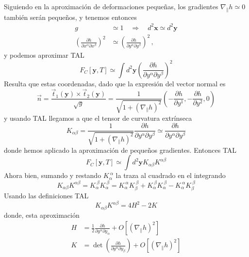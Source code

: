 Siguiendo en la aproximación de deformaciones pequeñas, los gradientes
$\nabla_{\|} h\simeq 0$ también serán pequeños, y tenemos entonces
\begin{align}
g&\simeq 1\quad\Rightarrow\quad d^2\mathbf{x}\simeq d^2\mathbf{y}\\
\left(\frac{\partial h}{\partial
  x^{\alpha} \partial x^{\beta}}\right)^2&\simeq \left(\frac{\partial h}{\partial
  y^{\alpha} \partial y^{\beta}}\right)^2\, ,
\end{align}
y podemos aproximar TAL
\begin{equation}
F_C[\mathbf{y},T]\simeq\int d^2\mathbf{y} \left(\frac{\partial h}{\partial
  y^{\alpha} \partial y^{\beta}}\right)^2
\end{equation}
Resulta que estas coordenadas, dado que la expresión del vector normal es
\begin{equation}
\vec{n}=\frac{\vec{t}_1(\mathbf{y})\times\vec{t}_2(\mathbf{y})}{\sqrt{g}}=\frac{1}{\sqrt{1+\left(\nabla_{\|} h\right)^2}} \left( -\frac{\partial h}{\partial y^1},-\frac{\partial h}{\partial y^2},0\right)
\end{equation}
y usando TAL llegamos a que el tensor de curvatura extrínseca
\begin{equation}
K_{\alpha\beta}=\frac{1}{\sqrt{1+\left(\nabla_{\|} h\right)^2}}\frac{\partial h}{\partial
  y^{\alpha} \partial y^{\beta}}\simeq \frac{\partial h}{\partial
  y^{\alpha} \partial y^{\beta}}
\end{equation}
donde hemos aplicado la aproximación de pequeños gradientes. Entonces TAL
\begin{equation}
F_C[\mathbf{y},T]\simeq\int d^2\mathbf{y} K_{\alpha\beta}K^{\alpha\beta}
\end{equation} 
Ahora bien, sumando y restando $K_{\alpha}^{\ \alpha}$ la traza al cuadrado en el
integrando
\begin{equation}
K_{\alpha\beta}K^{\alpha\beta}=K_{\alpha}^{\ \beta}K_{\alpha}^{\
  \beta}=K_{\alpha}^{\ \alpha}K_{\beta}^{\ \beta}+K_{\alpha}^{\ \beta}K_{\alpha}^{\ \beta}-K_{\alpha}^{\ \alpha}K_{\beta}^{\ \beta}
\end{equation}
Usando las definiciones TAL
\begin{equation}
K_{\alpha\beta}K^{\alpha\beta}=4H^2-2K
\end{equation} 
donde, esta aproximación
\begin{align}
H&=\frac{1}{2}\frac{\partial h}{\partial y^{\alpha} \partial y_{\alpha}}+O\left[\left(\nabla_{\|} h\right)^2\right]\\
K&=\det \left(\frac{\partial h}{\partial y^{\alpha} \partial y_{\beta}}\right)+O\left[\left(\nabla_{\|} h\right)^2\right]
\end{align}

